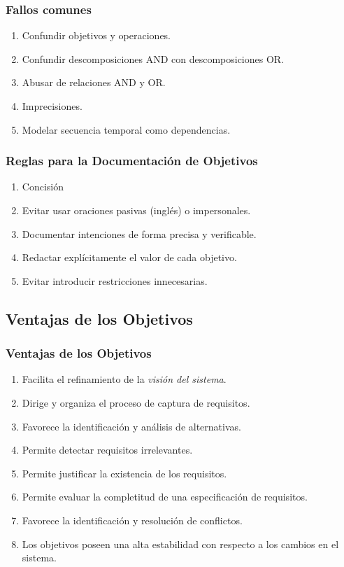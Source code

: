 \documentclass[handout,slidestop,xcolor=pst,dvips,blue]{beamer}
\begin{document}
\begin{frame}[c]
    \frametitle{Fallos comunes}
    \begin{enumerate}[<+->]
         \item Confundir objetivos y operaciones.
         \item Confundir descomposiciones AND con descomposiciones OR.
         \item Abusar de relaciones AND y OR.
         \item Imprecisiones.
         \item Modelar secuencia temporal como dependencias.
    \end{enumerate}
\end{frame}

\begin{frame}[c]
    \frametitle{Reglas para la Documentación de Objetivos}
    \begin{enumerate}[<+->]
        \item Concisión
        \item Evitar usar oraciones pasivas (inglés) o impersonales.
        \item Documentar intenciones de forma precisa y verificable.
        \item Redactar explícitamente el valor de cada objetivo.
        \item Evitar introducir restricciones innecesarias.
    \end{enumerate}
\end{frame}

\subsection{Ventajas de los Objetivos}

\begin{frame}[c]
	\frametitle{Ventajas de los Objetivos}
	\begin{enumerate}[<+->]
		\item Facilita el refinamiento de la \emph{visión del sistema}.
		\item Dirige y organiza el proceso de captura de requisitos.
		\item Favorece la identificación y análisis de alternativas.
		\item Permite detectar requisitos irrelevantes.
		\item Permite justificar la existencia de los requisitos.
		\item Permite evaluar la completitud de una especificación de requisitos.
		\item Favorece la identificación y resolución de conflictos.
		\item Los objetivos poseen una alta estabilidad con respecto a los cambios en el sistema.
	\end{enumerate}
\end{frame}
\end{document}
